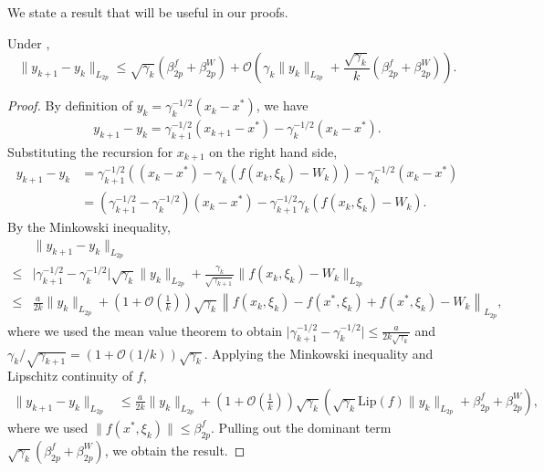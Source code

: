 \documentclass[11pt]{article}
\begin{document}
We state a result that will be useful in our proofs. 
\begin{lemma}\label{lem:yk_variation}
    Under , 
    \begin{equation}
        \lVert y_{k+1} - y_k \rVert_{L_{2p}} 
        \leq 
        \sqrt{\gamma_k} (\beta_{2p}^f + \beta_{2p}^W)
        +
        \mathcal{O}\left(\gamma_k \lVert y_k \rVert_{L_{2p}}+ \frac{\sqrt{\gamma_k}}{k} \left( \beta_{2p}^f + \beta_{2p}^W  \right) \right)  
        . 
    \end{equation}
\end{lemma}
\begin{proof}
    By definition of $y_k = \gamma_k^{-1/2}(x_k - x^*)$, we have
    \begin{align*}
        y_{k+1} - y_k = \gamma_{k+1}^{-1/2}(x_{k+1} - x^*) - \gamma_k^{-1/2}(x_k - x^*) . 
    \end{align*}
    Substituting the recursion for $x_{k+1}$ on the right hand side,
    \begin{align*}
        y_{k+1} - y_k 
        &= \gamma_{k+1}^{-1/2}((x_k - x^*) - \gamma_k (f(x_k, \xi_k) - W_k)) - \gamma_k^{-1/2}(x_k - x^*) 
        \\ &
        = (\gamma_{k+1}^{-1/2} - \gamma_k^{-1/2}) (x_k - x^*) - \gamma_{k+1}^{-1/2} \gamma_k (f(x_k, \xi_k) - W_k) . 
    \end{align*}
    By the Minkowski inequality, 
    \begin{align*}
        &\lVert y_{k+1} - y_k \rVert_{L_{2p}} 
        \\ \leq& 
        \lvert \gamma_{k+1}^{-1/2} - \gamma_k^{-1/2} \rvert \sqrt{\gamma_k} \lVert y_k \rVert_{L_{2p}} + \frac{\gamma_k}{\sqrt{\gamma_{k+1}}} \lVert f(x_k, \xi_k) - W_k \rVert_{L_{2p}} 
        \\ 
        \leq& \frac{a}{2k} \lVert y_k \rVert_{L_{2p}} + \left(1 +\mathcal{O}\left(\frac{1}{k}\right) \right)  \sqrt{\gamma_k} \left\lVert f(x_k, \xi_k) - f(x^*, \xi_k) + f(x^*, \xi_k) - W_k \right\rVert_{L_{2p}}
        ,
    \end{align*}
    where we used the mean value theorem to obtain $\lvert \gamma_{k+1}^{-1/2} - \gamma_k^{-1/2} \rvert \leq \frac{a}{2 k \sqrt{\gamma_k}}$ and $\gamma_k/\sqrt{\gamma_{k+1}} = (1 + \mathcal{O}(1/k)) \sqrt{\gamma_k}$. 
    Applying the Minkowski inequality and Lipschitz continuity of $f$, 
    \begin{align*}
        \lVert y_{k+1} - y_k \rVert_{L_{2p}}
        &\leq \frac{a}{2k} \lVert y_k \rVert_{L_{2p}} + \left(1 + \mathcal{O}\left(\frac{1}{k}\right)\right) \sqrt{\gamma_k} \left( \sqrt{\gamma_k} \mathrm{Lip}(f) \lVert y_k \rVert_{L_{2p}} + \beta_{2p}^f + \beta_{2p}^W  \right) , 
    \end{align*}
    where we used $\lVert f(x^*, \xi_k) \rVert \leq \beta_{2p}^f$. 
    Pulling out the dominant term $\sqrt{\gamma_k}(\beta_{2p}^f + \beta_{2p}^W)$, we obtain the result. 
\end{proof}
\end{document}
